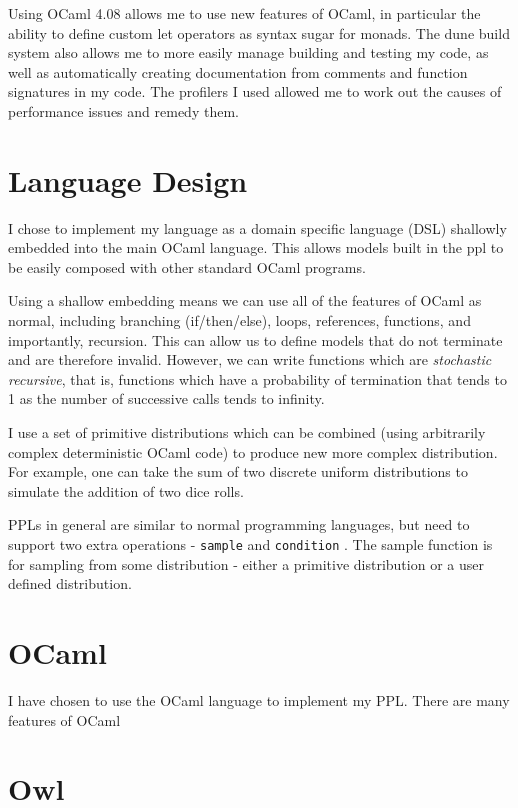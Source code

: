 Using OCaml 4.08 allows me to use new features of OCaml, in particular the ability to define custom let operators as syntax sugar for monads. The dune build system also allows me to more easily manage building and testing my code, as well as automatically creating documentation from comments and function signatures in my code. The profilers I used allowed me to work out the causes of performance issues and remedy them. 


\section{Language Design}
I chose to implement my language as a domain specific language (DSL) shallowly embedded into the main OCaml language. This allows models built in the ppl to be easily composed with other standard OCaml programs.

Using a shallow embedding means we can use all of the features of OCaml as normal, including branching (if/then/else), loops, references, functions, and importantly, recursion. This can allow us to define models that do not terminate and are therefore invalid. However, we can write functions which are \textit{stochastic recursive}, that is, functions which have a probability of termination that tends to 1 as the number of successive calls tends to infinity.

I use a set of primitive distributions which can be combined (using arbitrarily complex deterministic OCaml code) to produce new more complex distribution. For example, one can take the sum of two discrete uniform distributions to simulate the addition of two dice rolls. 

PPLs in general are similar to normal programming languages, but need to support two extra operations - \texttt{sample} and \texttt{condition} \cite{}. The sample function is for sampling from some distribution - either a primitive distribution or a user defined distribution.

\section{OCaml}
I have chosen to use the OCaml language to implement my PPL. There are many features of OCaml 

\section{Owl}

